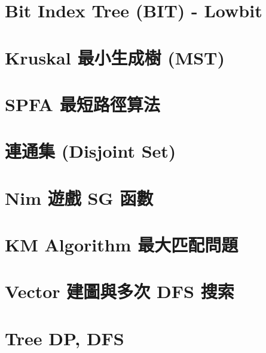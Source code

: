 \documentclass{article}
\begin{document}
\begin{multicols}{2}
\section{Bit Index Tree (BIT) - Lowbit}



\section{Kruskal 最小生成樹 (MST)}



\section{SPFA 最短路徑算法}



\section{連通集 (Disjoint Set)}



\section{Nim 遊戲 SG 函數}



\section{KM Algorithm 最大匹配問題}



\section{Vector 建圖與多次 DFS 搜索}



\section{Tree DP, DFS}


\end{multicols}
\end{document}
